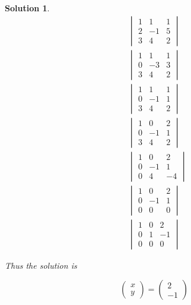 \documentclass{article}
\newtheorem*{solution}{Solution}
\begin{document}
\begin{solution}

\begin{align*}
&\begin{vmatrix}
1 & 1 & 1 \\ 
2 & -1 & 5 \\
3 & 4 & 2 
\end{vmatrix} \\
&\begin{vmatrix}
1 & 1 & 1 \\ 
0 & -3 & 3 \\
3 & 4 & 2 
\end{vmatrix} \\
&\begin{vmatrix}
1 & 1 & 1 \\ 
0 & -1 & 1 \\
3 & 4 & 2 
\end{vmatrix} \\
&\begin{vmatrix}
1 & 0 & 2 \\ 
0 & -1 & 1 \\
3 & 4 & 2 
\end{vmatrix} \\
&\begin{vmatrix}
1 & 0 & 2 \\ 
0 & -1 & 1 \\
0 & 4 & -4 
\end{vmatrix} \\
&\begin{vmatrix}
1 & 0 & 2 \\ 
0 & -1 & 1 \\
0 & 0 & 0 
\end{vmatrix} \\
&\begin{vmatrix}
1 & 0 & 2 \\ 
0 & 1 & -1 \\
0 & 0 & 0 
\end{vmatrix} 
\end{align*}

Thus the solution is 

\begin{equation*}
\begin{pmatrix}
x \\ y
\end{pmatrix}
=
\begin{pmatrix}
2 \\ -1
\end{pmatrix}
\end{equation*}

\end{solution}
\end{document}
